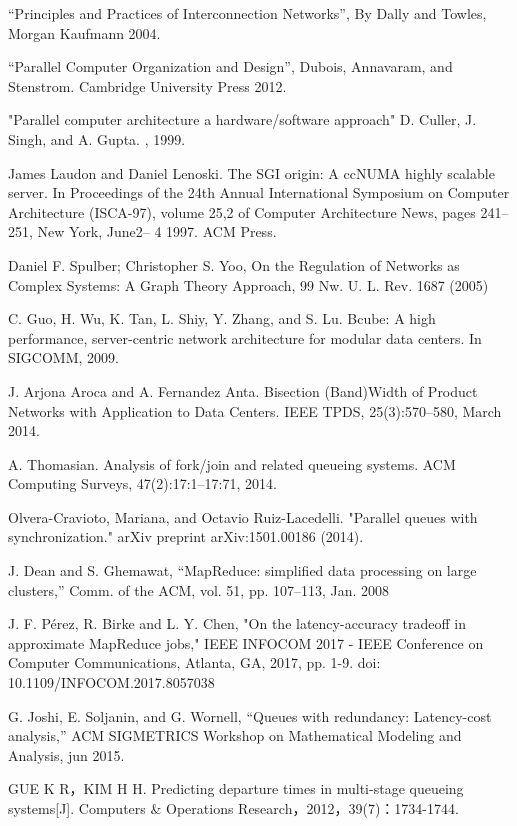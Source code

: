 \documentclass[letterpaper, 10 pt, conference]{ieeeconf}
\begin{document}
\begin{thebibliography}{99}

 “Principles and Practices of Interconnection Networks”, By Dally and Towles, Morgan Kaufmann 2004. 

 “Parallel Computer Organization and Design”, Dubois, Annavaram, and Stenstrom. Cambridge University Press 2012.

 "Parallel computer architecture a hardware/software approach" D. Culler, J. Singh, and A. Gupta. , 1999.

 James Laudon and Daniel Lenoski. The SGI origin: A ccNUMA highly scalable server. In Proceedings of the 24th Annual International Symposium on Computer Architecture (ISCA-97), volume 25,2 of Computer Architecture News, pages 241–251, New York, June2– 4 1997. ACM Press.

 Daniel F. Spulber; Christopher S. Yoo, On the Regulation of Networks as Complex Systems: A Graph Theory Approach, 99 Nw. U. L. Rev. 1687 (2005)

 C. Guo, H. Wu, K. Tan, L. Shiy, Y. Zhang, and S. Lu. Bcube: A high performance, server-centric network architecture for modular data centers. In SIGCOMM, 2009.

 J. Arjona Aroca and A. Fernandez Anta. Bisection (Band)Width of Product Networks with Application to Data Centers. IEEE TPDS, 25(3):570–580, March 2014.

 A. Thomasian. Analysis of fork/join and related queueing systems. ACM Computing Surveys, 47(2):17:1–17:71, 2014.

 Olvera-Cravioto, Mariana, and Octavio Ruiz-Lacedelli. "Parallel queues with synchronization." arXiv preprint arXiv:1501.00186 (2014).

 J. Dean and S. Ghemawat, “MapReduce: simplified data processing on large clusters,” Comm. of the ACM, vol. 51, pp. 107–113, Jan. 2008

 J. F. Pérez, R. Birke and L. Y. Chen, "On the latency-accuracy tradeoff in approximate MapReduce jobs," IEEE INFOCOM 2017 - IEEE Conference on Computer Communications, Atlanta, GA, 2017, pp. 1-9. doi: 10.1109/INFOCOM.2017.8057038

 G. Joshi, E. Soljanin, and G. Wornell, “Queues with redundancy: Latency-cost analysis,” ACM SIGMETRICS Workshop on Mathematical Modeling and Analysis, jun 2015.

 GUE K R，KIM H H. Predicting departure times in multi-stage queueing systems[J]. Computers \& Operations Research，2012，39(7)：1734-1744. 


\end{thebibliography}
\end{document}
